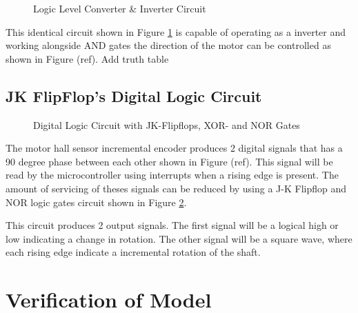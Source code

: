 \documentclass[a4paper,12pt]{article}
\begin{document}
	\begin{figure}[h]
		\centering
		
		\caption{Logic Level Converter \& Inverter Circuit}
		\label{fig:interterCirc}
	\end{figure}
	
	This identical circuit shown in Figure \ref{fig:interterCirc} is capable of operating as a inverter and working alongside AND gates the direction of the motor can be controlled as shown in Figure (ref). Add truth table
	
	\subsection{JK FlipFlop's Digital Logic Circuit}
	
	\begin{figure}[h]
		\centering
		
		\caption{Digital Logic Circuit with JK-Flipflops, XOR- and NOR Gates}
		\label{fig:jk_xor}
	\end{figure}
	
	The motor hall sensor incremental encoder produces 2 digital signals  that has a 90 degree phase between each other shown in Figure (ref). This signal will be read by the microcontroller using interrupts when a rising edge is present. The amount of servicing of theses signals can be reduced by using a J-K Flipflop and NOR logic gates circuit shown in Figure \ref{fig:jk_xor}. 
	
	This circuit produces 2 output signals. The first signal will be a logical high or low indicating a change in rotation. The other signal will be a square wave, where each rising edge indicate a incremental rotation of the shaft. 
	
	
	
	\section{Verification of Model}
	

	\newpage
	
	
	
\end{document}
